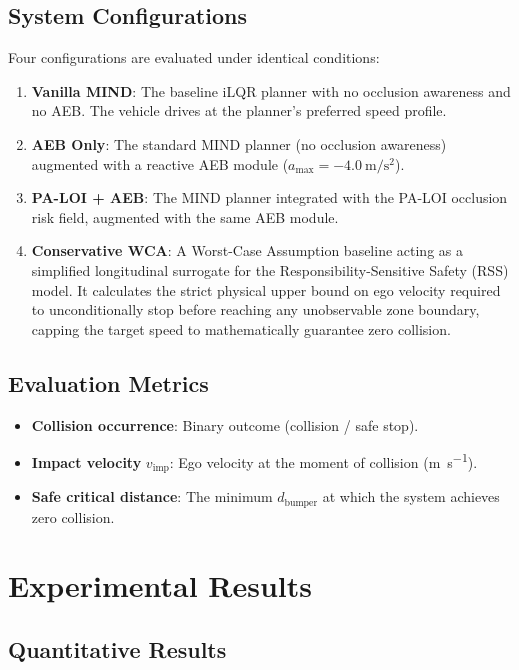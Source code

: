 \documentclass[conference]{IEEEtran}
\begin{document}
\subsection{System Configurations}
Four configurations are evaluated under identical conditions:
\begin{enumerate}
    \item \textbf{Vanilla MIND}: The baseline iLQR planner with no occlusion awareness and no AEB. The vehicle drives at the planner's preferred speed profile.
    \item \textbf{AEB Only}: The standard MIND planner (no occlusion awareness) augmented with a reactive AEB module ($a_{\text{max}} = \SI{-4.0}{\meter\per\second\squared}$).
    \item \textbf{PA-LOI + AEB}: The MIND planner integrated with the PA-LOI occlusion risk field, augmented with the same AEB module.
    \item \textbf{Conservative WCA}: A Worst-Case Assumption baseline acting as a simplified longitudinal surrogate for the Responsibility-Sensitive Safety (RSS) model. It calculates the strict physical upper bound on ego velocity required to unconditionally stop before reaching any unobservable zone boundary, capping the target speed to mathematically guarantee zero collision.
\end{enumerate}

\subsection{Evaluation Metrics}
\begin{itemize}
    \item \textbf{Collision occurrence}: Binary outcome (collision / safe stop).
    \item \textbf{Impact velocity} $v_{\text{imp}}$: Ego velocity at the moment of collision (\si{\meter\per\second}).
    \item \textbf{Safe critical distance}: The minimum $d_{\text{bumper}}$ at which the system achieves zero collision.
\end{itemize}

\section{Experimental Results}

\subsection{Quantitative Results}
\end{document}
